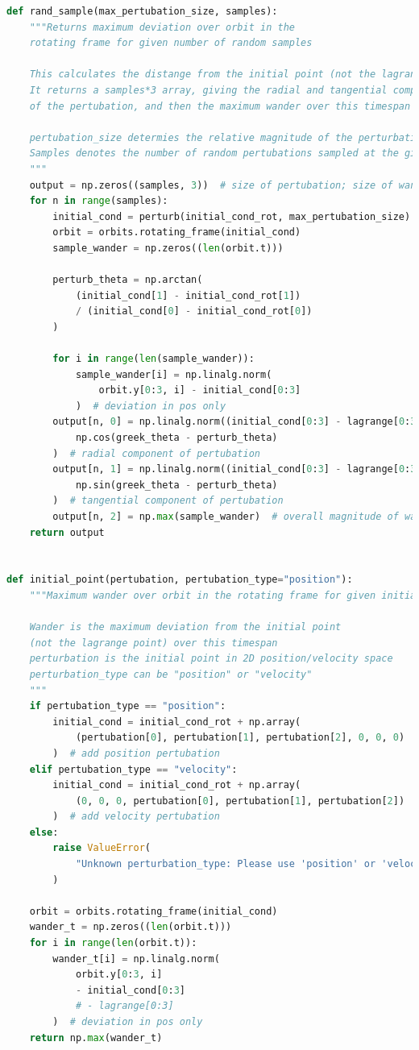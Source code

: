 \documentclass[11pt, a4paper,twocolumn]{article} %
\begin{document}
\begin{appendices}
\begin{lstlisting}[language=Python]
def rand_sample(max_pertubation_size, samples):
	"""Returns maximum deviation over orbit in the 
	rotating frame for given number of random samples
	
	This calculates the distange from the initial point (not the lagrange point)
	It returns a samples*3 array, giving the radial and tangential components
	of the pertubation, and then the maximum wander over this timespan
	
	pertubation_size determies the relative magnitude of the perturbation
	Samples denotes the number of random pertubations sampled at the given size
	"""
	output = np.zeros((samples, 3))  # size of pertubation; size of wander
	for n in range(samples):
		initial_cond = perturb(initial_cond_rot, max_pertubation_size)
		orbit = orbits.rotating_frame(initial_cond)
		sample_wander = np.zeros((len(orbit.t)))
		
		perturb_theta = np.arctan(
			(initial_cond[1] - initial_cond_rot[1])
			/ (initial_cond[0] - initial_cond_rot[0])
		)
		
		for i in range(len(sample_wander)):
			sample_wander[i] = np.linalg.norm(
				orbit.y[0:3, i] - initial_cond[0:3]
			)  # deviation in pos only
		output[n, 0] = np.linalg.norm((initial_cond[0:3] - lagrange[0:3])) * np.abs(
			np.cos(greek_theta - perturb_theta)
		)  # radial component of pertubation
		output[n, 1] = np.linalg.norm((initial_cond[0:3] - lagrange[0:3])) * np.abs(
			np.sin(greek_theta - perturb_theta)
		)  # tangential component of pertubation
		output[n, 2] = np.max(sample_wander)  # overall magnitude of wander
	return output


def initial_point(pertubation, pertubation_type="position"):
	"""Maximum wander over orbit in the rotating frame for given initial point 
	
	Wander is the maximum deviation from the initial point 
	(not the lagrange point) over this timespan
	perturbation is the initial point in 2D position/velocity space
	perturbation_type can be "position" or "velocity" 
	"""
	if pertubation_type == "position":
		initial_cond = initial_cond_rot + np.array(
			(pertubation[0], pertubation[1], pertubation[2], 0, 0, 0)
		)  # add position pertubation
	elif pertubation_type == "velocity":
		initial_cond = initial_cond_rot + np.array(
			(0, 0, 0, pertubation[0], pertubation[1], pertubation[2])
		)  # add velocity pertubation
	else:
		raise ValueError(
			"Unknown perturbation_type: Please use 'position' or 'velocity'"
		)
	
	orbit = orbits.rotating_frame(initial_cond)
	wander_t = np.zeros((len(orbit.t)))
	for i in range(len(orbit.t)):
		wander_t[i] = np.linalg.norm(
			orbit.y[0:3, i]
			- initial_cond[0:3]
			# - lagrange[0:3]
		)  # deviation in pos only
	return np.max(wander_t)

\end{lstlisting}

\end{appendices}


\restoregeometry
\end{document}
